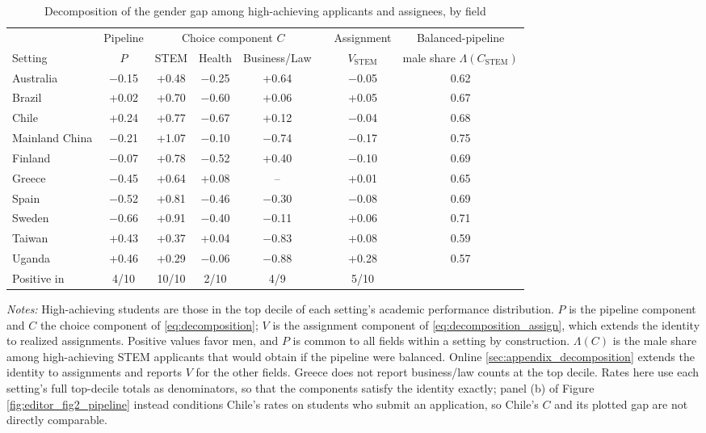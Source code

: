\begin{table}[htbp]
\centering
\caption{Decomposition of the gender gap among high-achieving applicants and assignees, by field}
\label{tab:crossfield_decomposition}
\footnotesize
\setlength{\tabcolsep}{3pt}
\begin{tabular}{lccccccc}
\toprule
 & Pipeline & \multicolumn{3}{c}{Choice component $C$} & & Assignment & Balanced-pipeline \\
\cmidrule(lr){3-5}
Setting & $P$ & STEM & Health & Business/Law & & $V_{\text{STEM}}$ & male share $\Lambda(C_{\text{STEM}})$ \\
\midrule
Australia & $-$0.15 & +0.48 & $-$0.25 & +0.64 & & $-$0.05 & 0.62 \\
Brazil & +0.02 & +0.70 & $-$0.60 & +0.06 & & +0.05 & 0.67 \\
Chile & +0.24 & +0.77 & $-$0.67 & +0.12 & & $-$0.04 & 0.68 \\
Mainland China & $-$0.21 & +1.07 & $-$0.10 & $-$0.74 & & $-$0.17 & 0.75 \\
Finland & $-$0.07 & +0.78 & $-$0.52 & +0.40 & & $-$0.10 & 0.69 \\
Greece & $-$0.45 & +0.64 & +0.08 & -- & & +0.01 & 0.65 \\
Spain & $-$0.52 & +0.81 & $-$0.46 & $-$0.30 & & $-$0.08 & 0.69 \\
Sweden & $-$0.66 & +0.91 & $-$0.40 & $-$0.11 & & +0.06 & 0.71 \\
Taiwan & +0.43 & +0.37 & +0.04 & $-$0.83 & & +0.08 & 0.59 \\
Uganda & +0.46 & +0.29 & $-$0.06 & $-$0.88 & & +0.28 & 0.57 \\
\midrule
Positive in & 4/10 & 10/10 & 2/10 & 4/9 & & 5/10 & \\
\bottomrule
\end{tabular}
\begin{minipage}{\textwidth}\vspace{4pt}\scriptsize \textit{Notes:} High-achieving students are those in the top decile of each setting's academic performance distribution. $P$ is the pipeline component and $C$ the choice component of \eqref{eq:decomposition}; $V$ is the assignment component of \eqref{eq:decomposition_assign}, which extends the identity to realized assignments. Positive values favor men, and $P$ is common to all fields within a setting by construction. $\Lambda(C)$ is the male share among high-achieving STEM applicants that would obtain if the pipeline were balanced. Online \ref{sec:appendix_decomposition} extends the identity to assignments and reports $V$ for the other fields. Greece does not report business/law counts at the top decile. Rates here use each setting's full top-decile totals as denominators, so that the components satisfy the identity exactly; panel (b) of Figure \ref{fig:editor_fig2_pipeline} instead conditions Chile's rates on students who submit an application, so Chile's $C$ and its plotted gap are not directly comparable. \end{minipage}
\end{table}
